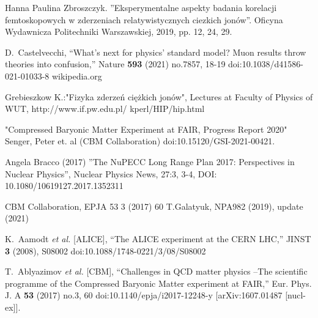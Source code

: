 \begin{thebibliography}{99}
	\thispagestyle{fancy}
	 Hanna Paulina Zbroszczyk. ''Eksperymentalne aspekty badania korelacji femtoskopowych w zderzeniach relatywistycznych ciezkich jonów''. Oficyna Wydawnicza Politechniki Warszawskiej, 2019, pp. 12, 24, 29.
	
	D.~Castelvecchi,
    ``What\textquoteright{}s next for physics\textquoteright{} standard model? Muon results throw theories into confusion,''
    Nature \textbf{593} (2021) no.7857, 18-19
    doi:10.1038/d41586-021-01033-8
    wikipedia.org
    
    Grebieszkow K.:"Fizyka zderzeń ciężkich jonów", Lectures at Faculty of Physics of WUT, http://www.if.pw.edu.pl/ kperl/HIP/hip.html
    
    "Compressed Baryonic Matter Experiment at FAIR, Progress Report 2020" Senger, Peter et. al (CBM Collaboration) doi:10.15120/GSI-2021-00421.
    
    Angela Bracco (2017) ''The NuPECC Long Range Plan 2017: Perspectives in Nuclear Physics'', Nuclear Physics News, 27:3, 3-4, DOI: 10.1080/10619127.2017.1352311
    
    CBM Collaboration, EPJA 53 3 (2017) 60
    T.Galatyuk, NPA982 (2019), update (2021)
    
    K.~Aamodt \textit{et al.} [ALICE],
    ``The ALICE experiment at the CERN LHC,''
    JINST \textbf{3} (2008), S08002
    doi:10.1088/1748-0221/3/08/S08002
    
    T.~Ablyazimov \textit{et al.} [CBM],
    ``Challenges in QCD matter physics --The scientific programme of the Compressed Baryonic Matter experiment at FAIR,''
    Eur. Phys. J. A \textbf{53} (2017) no.3, 60
    doi:10.1140/epja/i2017-12248-y
    [arXiv:1607.01487 [nucl-ex]].
    

\end{thebibliography}
